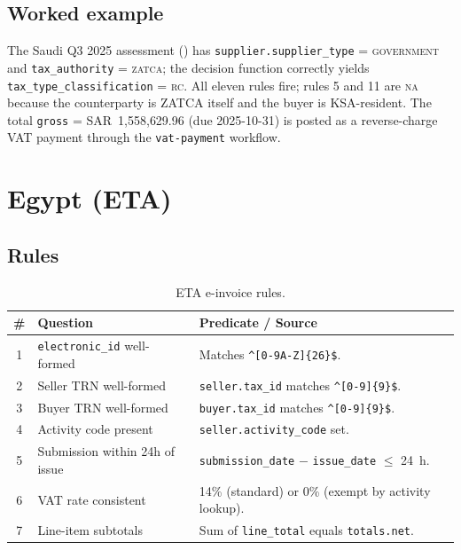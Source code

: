 \subsection{Worked example}

The Saudi Q3 2025 assessment () has
\texttt{supplier.supplier\_type} = \textsc{government} and
\texttt{tax\_authority} = \textsc{zatca}; the decision function
correctly yields \texttt{tax\_type\_classification} = \textsc{rc}. All
eleven rules fire; rules 5 and 11 are \textsc{na} because the
counterparty is ZATCA itself and the buyer is KSA-resident. The total
\texttt{gross} = SAR~1{,}558{,}629.96 (due 2025-10-31) is posted as a
reverse-charge VAT payment through the \texttt{vat-payment} workflow.

\section{Egypt (ETA)}

\subsection{Rules}

\begin{table}[htbp]
\centering
\caption{ETA e-invoice rules.}
\label{tab:eta-rules}
\footnotesize
\begin{tabularx}{\linewidth}{@{}c l X@{}}
\toprule
\textbf{\#} & \textbf{Question} & \textbf{Predicate / Source} \\ \midrule
1 & \texttt{electronic\_id} well-formed
  & Matches \verb|^[0-9A-Z]{26}$|. \\
2 & Seller TRN well-formed   & \texttt{seller.tax\_id} matches \verb|^[0-9]{9}$|. \\
3 & Buyer TRN well-formed    & \texttt{buyer.tax\_id} matches \verb|^[0-9]{9}$|. \\
4 & Activity code present    & \texttt{seller.activity\_code} set. \\
5 & Submission within 24h of issue
  & \texttt{submission\_date} $-$ \texttt{issue\_date} $\leq$ 24~h. \\
6 & VAT rate consistent      & 14\% (standard) or 0\% (exempt by activity lookup). \\
7 & Line-item subtotals      & Sum of \texttt{line\_total} equals \texttt{totals.net}. \\
\bottomrule
\end{tabularx}
\end{table}


